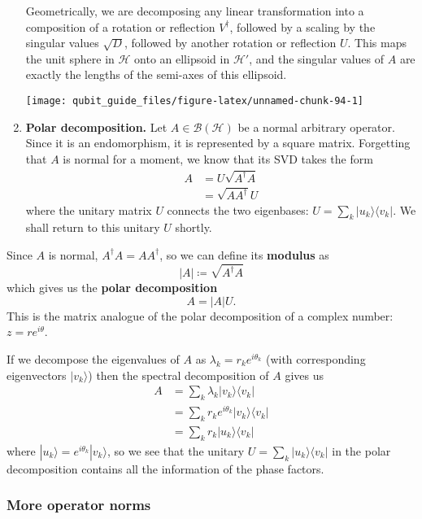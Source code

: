 \documentclass[fleqn]{article}
\begin{document}
\begin{enumerate}
  Geometrically, we are decomposing any linear transformation into a composition of a rotation or reflection \(V^\dagger\), followed by a scaling by the singular values \(\sqrt{D}\), followed by another rotation or reflection \(U\).
  This maps the unit sphere in \(\mathcal{H}\) onto an ellipsoid in \(\mathcal{H}'\), and the singular values of \(A\) are exactly the lengths of the semi-axes of this ellipsoid.

  \begin{center}\texttt{[image: qubit\_guide\_files/figure-latex/unnamed-chunk-94-1]} \end{center}
\item
  \textbf{Polar decomposition.}
  Let \(A\in\mathcal{B}(\mathcal{H})\) be a normal arbitrary operator.
  Since it is an endomorphism, it is represented by a square matrix.
  Forgetting that \(A\) is normal for a moment, we know that its SVD takes the form
  \[
   \begin{aligned}
     A
     &= U\sqrt{A^\dagger A}
   \\&= \sqrt{AA^\dagger}U
   \end{aligned}
    \]
  where the unitary matrix \(U\) connects the two eigenbases: \(U=\sum_k|u_k\rangle\langle v_k|\).
  We shall return to this unitary \(U\) shortly.
\end{enumerate}

Since \(A\) is normal, \(A^\dagger A=AA^\dagger\), so we can define its \textbf{modulus} as
\[
    |A| \coloneqq \sqrt{A^\dagger A}
  \]
which gives us the \textbf{polar decomposition}
\[
    A = |A|U.
  \]
This is the matrix analogue of the polar decomposition of a complex number: \(z=re^{i\theta}\).

If we decompose the eigenvalues of \(A\) as \(\lambda_k=r_k e^{i\theta_k}\) (with corresponding eigenvectors \(|v_k\rangle\)) then the spectral decomposition of \(A\) gives us
\[
    \begin{aligned}
      A
      &= \sum_k \lambda_k|v_k\rangle\langle v_k|
    \\&= \sum_k r_ke^{i\theta_k}|v_k\rangle\langle v_k|
    \\&= \sum_k r_k|u_k\rangle\langle v_k|
    \end{aligned}
  \]
where \(|u_k\rangle=e^{i\theta_k}|v_k\rangle\), so we see that the unitary \(U=\sum_k|u_k\rangle\langle v_k|\) in the polar decomposition contains all the information of the phase factors.

\hypertarget{more-operator-norms}{%
\subsubsection{More operator norms}\label{more-operator-norms}}
\end{document}
